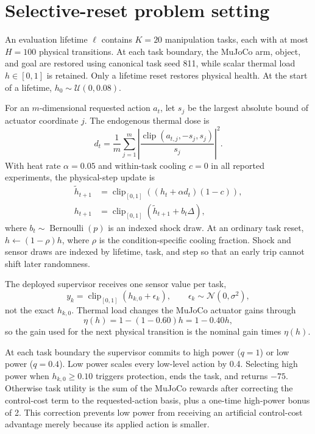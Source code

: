 \section{Selective-reset problem setting}
\label{sec:problem}

An evaluation lifetime $\ell$ contains $K=20$ manipulation tasks, each with at
most $H=100$ physical transitions. At each task boundary, the MuJoCo arm,
object, and goal are restored using canonical task seed 811, while scalar
thermal load $h\in[0,1]$ is retained. Only a lifetime reset restores physical
health. At the start of a lifetime, $h_0\sim\mathcal{U}(0,0.08)$.

For an $m$-dimensional requested action $a_t$, let $s_j$ be the largest absolute
bound of actuator coordinate $j$. The endogenous thermal dose is
\begin{equation}
 d_t=\frac{1}{m}\sum_{j=1}^{m}
 \left|\frac{\operatorname{clip}(a_{t,j},-s_j,s_j)}{s_j}\right|^2.
 \label{eq:dose}
\end{equation}
With heat rate $\alpha=0.05$ and within-task cooling $c=0$ in all reported
experiments, the physical-step update is
\begin{align}
 \widetilde h_{t+1} &= \operatorname{clip}_{[0,1]}
   \left((h_t+\alpha d_t)(1-c)\right), \\
 h_{t+1} &= \operatorname{clip}_{[0,1]}
   \left(\widetilde h_{t+1}+b_t\Delta\right),
 \label{eq:thermal-step}
\end{align}
where $b_t\sim\operatorname{Bernoulli}(p)$ is an indexed shock draw. At an
ordinary task reset, $h\leftarrow(1-\rho)h$, where $\rho$ is the
condition-specific cooling fraction. Shock and sensor draws are indexed by
lifetime, task, and step so that an early trip cannot shift later randomness.

The deployed supervisor receives one sensor value per task,
\begin{equation}
 y_k=\operatorname{clip}_{[0,1]}(h_{k,0}+\epsilon_k),\qquad
 \epsilon_k\sim\mathcal{N}(0,\sigma^2),
 \label{eq:sensor}
\end{equation}
not the exact $h_{k,0}$. Thermal load changes the MuJoCo actuator gains through
\begin{equation}
 \eta(h)=1-(1-0.60)h=1-0.40h,
 \label{eq:efficiency}
\end{equation}
so the gain used for the next physical transition is the nominal gain times
$\eta(h)$.

At each task boundary the supervisor commits to high power ($q=1$) or low
power ($q=0.4$). Low power scales every low-level action by 0.4. Selecting high
power when $h_{k,0}\geq0.10$ triggers protection, ends the task, and returns
$-75$. Otherwise task utility is the sum of the MuJoCo rewards after correcting
the control-cost term to the requested-action basis, plus a one-time high-power
bonus of 2. This correction prevents low power from receiving an artificial
control-cost advantage merely because its applied action is smaller.

